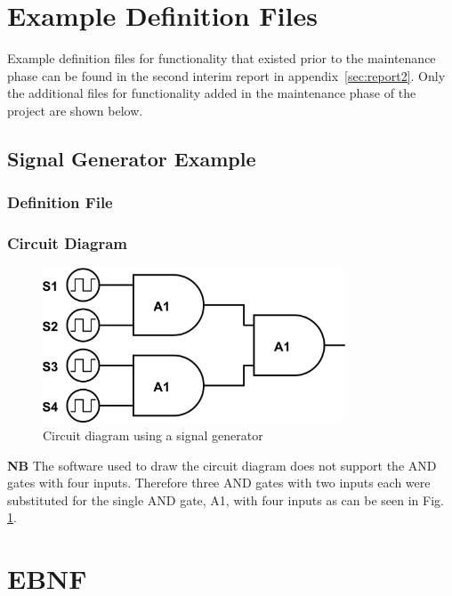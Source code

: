 \documentclass[a4paper,10pt]{article}
\begin{document}
\appendix

\section{Example Definition Files}
\label{sec:examples}
Example definition files for functionality that existed prior to the maintenance phase can be found in the second interim report in appendix~\ref{sec:report2}. Only the additional files for functionality added in the maintenance phase of the project are shown below. 

\subsection{Signal Generator Example}

\subsubsection{Definition File}


\subsubsection{Circuit Diagram}
\begin{figure}[h]
 \centering
 \includegraphics[width=9cm]{../../examples/siggen.png}
 \caption{Circuit diagram using a signal generator}
 \label{fig:example-siggen}
\end{figure}

\textbf{NB} The software used to draw the circuit diagram does not support the AND gates with four inputs. Therefore three AND gates with two inputs each were substituted for the single AND gate, A1, with four inputs as can be seen in Fig. \ref{fig:example-siggen}.



\section{EBNF}
\label{sec:EBNF}
\end{document}

